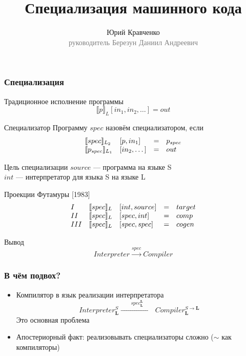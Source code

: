 \documentclass[demo]{beamer}
\begin{document}
\title{Специализация машинного кода}
\author{Юрий Кравченко\\{\footnotesize\textcolor{gray}{руководитель Березун Даниил Андреевич}}}
\frame{\titlepage}

\begin{frame}\frametitle{Специализация}
  \begin{block}{Традиционное исполнение программы}
    $$\llbracket p \rrbracket_L [in_1, in_2, \dots] = out$$
  \end{block}
  \begin{block}{Специализатор}
    Программу $spec$ назовём специализатором, если
    $$\begin{array}{l l c l}
        \llbracket spec \rrbracket_{L_2} & [p, in_1] &= &p_{spec}\\
        \llbracket p_{spec} \rrbracket_{L_1} & [in_2,\dots] &= &out
      \end{array}$$
    \end{block}
\end{frame}

\begin{frame}{Цель специализации}
  $source$ --- программа на языке S\\
  $int$ --- интерпретатор для языка S на языке L\\
  \vfill
  \begin{block}{Проекции Футамуры \hfill [1983]}
    $$
    \begin{array}{l l l c l}
      I & \llbracket spec \rrbracket_L &[int, source] &= &target\\
      II & \llbracket spec \rrbracket_L &[spec, int] &= &comp\\
      III & \llbracket spec \rrbracket_L &[spec, spec] &= &cogen
    \end{array}$$
  \end{block}
  \vfill
  \begin{block}{Вывод}
    $$Interpreter \overset{spec}{\longrightarrow} Compiler$$
  \end{block}
\end{frame}

\begin{frame}\frametitle{В чём подвох?}
  \begin{itemize}
  \item{ Компилятор в язык реализации интерпретатора
      $$Interpreter^{S}_{\mathbf{L}}
      \xrightarrow{\qquad spec^{\mathbf{L}}_{\mathbf{L}}\qquad} Compiler^{S \to \mathbf{L}}_{\mathbf{L}}$$
      \hfill {\large \color{red}Это основная проблема}
    }
    \vfill
  \item {Апостериорный факт: реализовывать специализаторы сложно ($\sim$ как компиляторы)}
  \end{itemize}
\end{frame}
\end{document}
